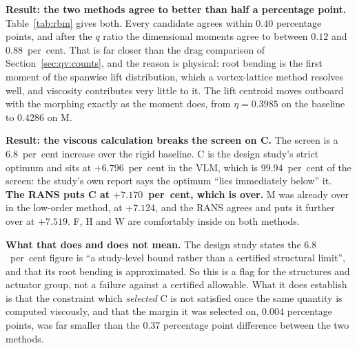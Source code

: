 \textbf{Result: the two methods agree to better than half a percentage point.}
Table~\ref{tab:rbm} gives both. Every candidate agrees within $0.40$ percentage points, and after
the $q$ ratio the dimensional moments agree to between $0.12$ and $0.88$~per~cent. That is far
closer than the drag comparison of Section~\ref{sec:qv:counts}, and the reason is physical: root
bending is the first moment of the spanwise lift distribution, which a vortex-lattice method
resolves well, and viscosity contributes very little to it. The lift centroid moves outboard with
the morphing exactly as the moment does, from $\eta = 0.3985$ on the baseline to $0.4286$ on M.

\textbf{Result: the viscous calculation breaks the screen on C.} The screen is a $6.8$~per~cent
increase over the rigid baseline. C is the design study's strict optimum and sits at
$+6.796$~per~cent in the VLM, which is $99.94$~per~cent of the screen: the study's own report
says the optimum ``lies immediately below'' it. \textbf{The RANS puts C at $+7.170$~per~cent,
which is over.} M was already over in the low-order method, at $+7.124$, and the RANS agrees and
puts it further over at $+7.519$. F, H and W are comfortably inside on both methods.

\textbf{What that does and does not mean.} The design study states the $6.8$~per~cent figure is
``a study-level bound rather than a certified structural limit'', and that its root bending is
approximated. So this is a flag for the structures and actuator group, not a failure against a
certified allowable. What it does establish is that the constraint which \emph{selected} C is not
satisfied once the same quantity is computed viscously, and that the margin it was selected on,
$0.004$ percentage points, was far smaller than the $0.37$ percentage point difference between the
two methods.

